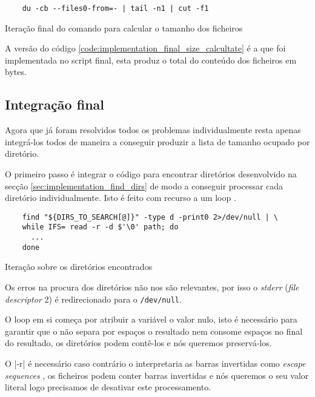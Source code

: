\begin{listing}[H]
	\centering
	\begin{verbatim}
    du -cb --files0-from=- | tail -n1 | cut -f1
  \end{verbatim}
	\caption{Iteração final do comando para calcular o tamanho dos ficheiros}
	\label{code:implementation_final_size_calcultate}
\end{listing}

A versão do código \ref{code:implementation_final_size_calcultate} é a que foi
implementada no script final, esta produz o total do conteúdo dos ficheiros em
bytes.

\subsection{Integração final}\label{sec:implementation_spacecheck_integration}

Agora que já foram resolvidos todos os problemas individualmente resta apenas
integrá-los todos de maneira a conseguir produzir a lista de tamanho ocupado por
diretório.

O primeiro passo é integrar o código para encontrar diretórios desenvolvido na
secção \ref{sec:implementation_find_dirs} de modo a conseguir processar cada
diretório individualmente. Isto é feito com recurso a um loop
.

\begin{listing}[H]
	\centering
	\begin{verbatim}
    find "${DIRS_TO_SEARCH[@]}" -type d -print0 2>/dev/null | \
    while IFS= read -r -d $'\0' path; do
      ...
    done
  \end{verbatim}
	\caption{Iteração sobre os diretórios encontrados}
\end{listing}

Os erros na procura dos diretórios não nos são relevantes, por isso o
\emph{stderr} (\emph{file descriptor} 2) é redirecionado para o
\Verb|/dev/null|.

O loop em si começa por atribuir a variável  o valor nulo, isto
é necessário para garantir que o \bashinline{read} não separa por espaços o
resultado nem consome espaços no final do resultado, os diretórios podem
contê-los e nós queremos preservá-los.

O \bashinline|-r| é necessário caso contrário o  interpretaria
as barras invertidas como \emph{escape sequences} \cite[3191-3193]{posix}, os
ficheiros podem conter barras invertidas e nós queremos o seu valor literal logo
precisamos de desativar este processamento.

